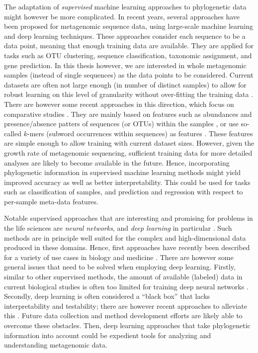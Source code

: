 The adaptation of \emph{supervised} machine learning approaches to phylogenetic data might however be more complicated.
In recent years, several approaches have been proposed for metagenomic sequence data,
using large-scale machine learning \cite{Vervier2015,Soueidan2015}
and deep learning \cite{Angermueller2016,Fiannaca2018} techniques.
These approaches consider each sequence to be a data point, meaning that enough training data are available.
They are applied for tasks such as OTU clustering, sequence classification, taxonomic assignment, and gene prediction.
In this thesis however, we are interested in whole metagenomic samples (instead of single sequences)
as the data points to be considered.
Current datasets are often not large enough (in number of distinct samples)
to allow for robust learning on this level of granularity without over-fitting the training data \cite{Angermueller2016}.
There are however some recent approaches in this direction, which focus on comparative studies \cite{Soueidan2015}.
They are mainly based on features such as
abundances and presence/absence patters of sequences (or \acsp{OTU}) within the samples \cite{Pasolli2016},
or use so-called $k$-mers (subword occurrences within sequences) as features \cite{Asgari2015}.
These features are simple enough to allow training with current dataset sizes.
However, given the growth rate of metagenomic sequencing,
sufficient training data for more detailed analyses are likely to become available in the future.
Hence, incorporating phylogenetic information in supervised machine learning methods might yield
improved accuracy as well as better interpretability.
This could be used for tasks such as classification of samples,
and prediction and regression with respect to per-sample meta-data features.

Notable supervised approaches that are interesting and promising for problems in the life sciences
are \emph{neural networks}, and \emph{deep learning} in particular \cite{Skansi2018}.
Such methods are in principle well suited for the complex and high-dimensional data produced in these domains.
Hence, first approaches have recently been described
for a variety of use cases in biology and medicine \cite{Mamoshina2016,Min2017,Ching2018}.
There are however some general issues that need to be solved when employing deep learning.
Firstly, similar to other supervised methods, the amount of available (labeled) data in current biological studies
is often too limited for training deep neural networks \cite{Min2017,Ching2018}.
Secondly, deep learning is often considered a ``black box'' that lacks interpretability and testability;
there are however recent approaches to alleviate this \cite{Min2017,Reiman2018}.
Future data collection and method development efforts are likely able to overcome these obstacles.
Then, deep learning approaches that take phylogenetic information into account
could be expedient tools for analyzing and understanding metagenomic data.

